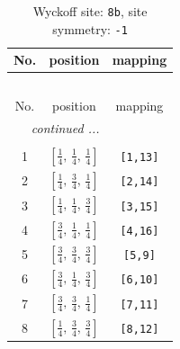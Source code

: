 \documentclass[fleqn,8pt]{jsarticle}
\begin{document}
\begin{longtable}{ccc}
\caption{Wyckoff site: {\tt 8b}, site symmetry: {\tt -1}}
 \\
 \hline \hline
No. & position & mapping \\ \hline \endfirsthead

\multicolumn{2}{l}{\tablename\ \thetable{}} \\
 \hline \hline
No. & position & mapping \\ \hline \endhead

 \hline \hline
\multicolumn{2}{r}{\footnotesize\it continued ...} \\ \endfoot

 \hline \hline
\multicolumn{2}{r}{} \\ \endlastfoot

1 & $\left[ \frac{1}{4},\, \frac{1}{4},\, \frac{1}{4} \right]$ & {\tt [1,13]} \\ \hline
2 & $\left[ \frac{1}{4},\, \frac{3}{4},\, \frac{1}{4} \right]$ & {\tt [2,14]} \\ \hline
3 & $\left[ \frac{1}{4},\, \frac{1}{4},\, \frac{3}{4} \right]$ & {\tt [3,15]} \\ \hline
4 & $\left[ \frac{3}{4},\, \frac{1}{4},\, \frac{1}{4} \right]$ & {\tt [4,16]} \\ \hline
5 & $\left[ \frac{3}{4},\, \frac{3}{4},\, \frac{3}{4} \right]$ & {\tt [5,9]} \\ \hline
6 & $\left[ \frac{3}{4},\, \frac{1}{4},\, \frac{3}{4} \right]$ & {\tt [6,10]} \\ \hline
7 & $\left[ \frac{3}{4},\, \frac{3}{4},\, \frac{1}{4} \right]$ & {\tt [7,11]} \\ \hline
8 & $\left[ \frac{1}{4},\, \frac{3}{4},\, \frac{3}{4} \right]$ & {\tt [8,12]} \\
\end{longtable}
\renewcommand{\arraystretch}{1.2}
\end{document}
